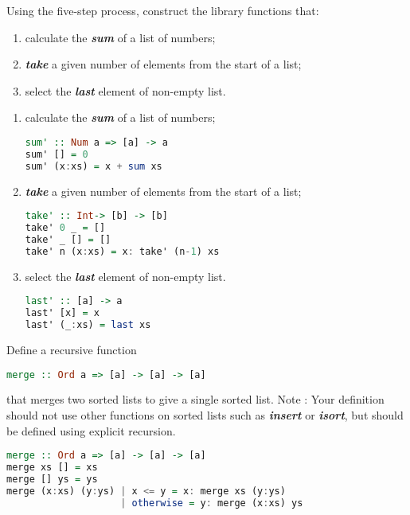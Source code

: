 \documentclass{article}
\begin{document}
 \begin{Exercise}[difficulty = 3]
Using the five-step process, construct the library functions that: 
\begin{enumerate}
	\item calculate the \textbf{\textit{sum}} of a list of numbers;
	\item \textbf{\textit{take}} a given number of elements from the start of a list;
	\item select the \textbf{\textit{last}} element of non-empty list.
\end{enumerate}

\end{Exercise}
\begin{Answer}
\begin{enumerate}
	\item calculate the \textbf{\textit{sum}} of a list of numbers;
\begin{lstlisting}[language=Haskell]
sum' :: Num a => [a] -> a
sum' [] = 0
sum' (x:xs) = x + sum xs
\end{lstlisting}
	\item \textbf{\textit{take}} a given number of elements from the start of a list;
	\begin{lstlisting}[language=Haskell]
take' :: Int-> [b] -> [b]
take' 0 _ = []
take' _ [] = []
take' n (x:xs) = x: take' (n-1) xs
\end{lstlisting}
	\item select the \textbf{\textit{last}} element of non-empty list.
	\begin{lstlisting}[language=Haskell]
last' :: [a] -> a
last' [x] = x
last' (_:xs) = last xs
\end{lstlisting}
\end{enumerate}
\end{Answer}
\pagebreak
\begin{Exercise}[difficulty = 3]
Define a recursive function 
\begin{lstlisting}[language=Haskell]
  merge :: Ord a => [a] -> [a] -> [a]
\end{lstlisting}
that merges two sorted lists to give a single sorted list. 
Note : Your definition should not use other functions on sorted lists such as  \textbf{\textit{insert}} or  \textbf{\textit{isort}}, but should be defined using explicit recursion.
\end{Exercise}
\begin{Answer}
\begin{lstlisting}[language=Haskell]
merge :: Ord a => [a] -> [a] -> [a]
merge xs [] = xs
merge [] ys = ys
merge (x:xs) (y:ys) | x <= y = x: merge xs (y:ys)
                    | otherwise = y: merge (x:xs) ys
\end{lstlisting}
\end{Answer}
\end{document}
